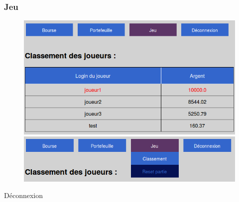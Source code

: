     \subsubsection{Jeu}
    \begin{figure}[H]
      \center
      \includegraphics[scale=0.5]{../graph/8-jeuclassement.png}
      \includegraphics[scale=0.5]{../graph/8-jeuresetpartie.png}
    \end{figure} 

    Déconnexion